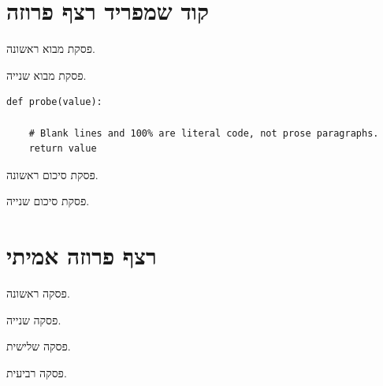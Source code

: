 \section{קוד שמפריד רצף פרוזה}
פסקת מבוא ראשונה.

פסקת מבוא שנייה.

\begin{asmblock}
\begin{lstlisting}
def probe(value):

    # Blank lines and 100% are literal code, not prose paragraphs.
    return value
\end{lstlisting}
\end{asmblock}

פסקת סיכום ראשונה.

פסקת סיכום שנייה.

\section{רצף פרוזה אמיתי}
פסקה ראשונה.

פסקה שנייה.

פסקה שלישית.

פסקה רביעית.
